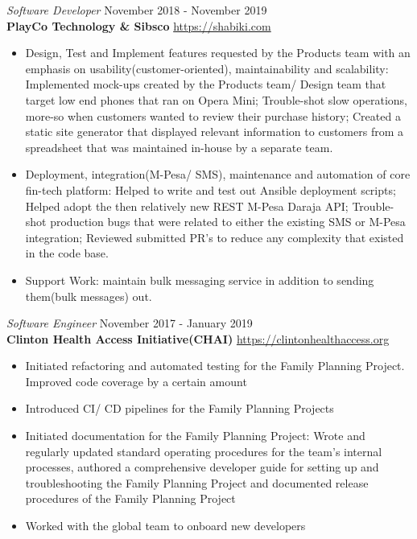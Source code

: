\documentclass[margin, line]{res} %
\begin{document}

{\sl Software Developer} \hfill November 2018 - November 2019 \\
\textbf{PlayCo Technology \& Sibsco } \hfill \url{https://shabiki.com}
\begin{itemize} \itemsep -2pt
\item Design, Test and Implement features requested by the Products
  team with an emphasis on usability(customer-oriented),
  maintainability and scalability: Implemented mock-ups created by the
  Products team/ Design team that target low end phones that ran on
  Opera Mini; Trouble-shot slow operations, more-so when customers
  wanted to review their purchase history; Created a static site
  generator that displayed relevant information to customers from a
  spreadsheet that was maintained in-house by a separate team.
\item Deployment, integration(M-Pesa/ SMS), maintenance and automation
  of core fin-tech platform: Helped to write and test out Ansible
  deployment scripts; Helped adopt the then relatively new REST M-Pesa
  Daraja API; Trouble-shot production bugs that were related to either
  the existing SMS or M-Pesa integration; Reviewed submitted PR’s to
  reduce any complexity that existed in the code base.
\item Support Work: maintain bulk messaging service in addition to
  sending them(bulk messages) out.
\end{itemize}


    {\sl Software Engineer} \hfill November 2017 - January 2019 \\
    \textbf{Clinton Health Access Initiative(CHAI)} \hfill \url{https://clintonhealthaccess.org}
    \begin{itemize} \itemsep -2pt %
    \item Initiated refactoring and automated testing for the Family Planning Project. Improved code coverage by a certain amount
    \item Introduced CI/ CD pipelines for the Family Planning Projects
    \item Initiated documentation for the Family Planning Project: Wrote and regularly updated standard operating procedures for the team's internal processes, authored a comprehensive developer guide for setting up and troubleshooting the Family Planning Project and documented release procedures of the Family Planning Project
    \item Worked with the global team to onboard new developers
    \end{itemize}
\end{document}
